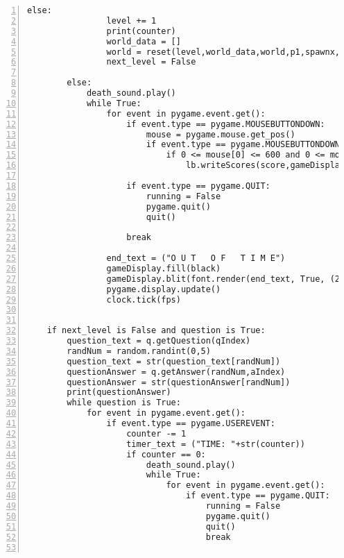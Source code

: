 \documentclass[12pt]{report}
\begin{document}
\begin{Verbatim}[numbers=left, frame=single]
            else:
                level += 1
                print(counter)
                world_data = []
                world = reset(level,world_data,world,p1,spawnx,spawny)
                next_level = False

        else:
            death_sound.play()
            while True:                                                             
                for event in pygame.event.get():
                    if event.type == pygame.MOUSEBUTTONDOWN:
                        mouse = pygame.mouse.get_pos()
                        if event.type == pygame.MOUSEBUTTONDOWN:
                            if 0 <= mouse[0] <= 600 and 0 <= mouse[1] <= 600:
                                lb.writeScores(score,gameDisplay,fps,username)

                    if event.type == pygame.QUIT:                                                               
                        running = False
                        pygame.quit()
                        quit()
                        
                    break
                
                end_text = ("O U T   O F   T I M E")
                gameDisplay.fill(black)
                gameDisplay.blit(font.render(end_text, True, (255, 255, 255)), (200, 280))
                pygame.display.update()
                clock.tick(fps)


    if next_level is False and question is True:
        question_text = q.getQuestion(qIndex)
        randNum = random.randint(0,5)                                                  
        question_text = str(question_text[randNum])
        questionAnswer = q.getAnswer(randNum,aIndex)
        questionAnswer = str(questionAnswer[randNum])
        print(questionAnswer)     
        while question is True:
            for event in pygame.event.get():
                if event.type == pygame.USEREVENT:
                    counter -= 1
                    timer_text = ("TIME: "+str(counter))
                    if counter == 0:
                        death_sound.play()
                        while True:
                            for event in pygame.event.get():
                                if event.type == pygame.QUIT:                                                               
                                    running = False
                                    pygame.quit()
                                    quit()
                                    break
                                

\end{Verbatim}
\end{document}
